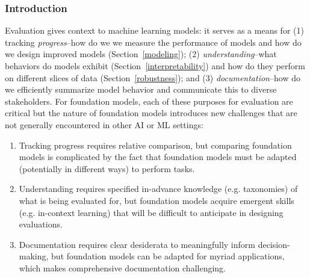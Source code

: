 \subsubsection{Introduction}
\label{sec:evaluation-introduction}
Evaluation gives context to machine learning models: it serves as a means for (1) tracking \textit{progress}--how do we we measure the performance of models and how do we design improved models (Section~\ref{modeling}); (2) \textit{understanding}--what behaviors do models exhibit (Section~\ref{interpretability}) and how do they perform on different slices of data (Section~\ref{robustness}); and (3) \textit{documentation}--how do we efficiently summarize model behavior and communicate this to diverse stakeholders. For foundation models, each of these purposes for evaluation are critical but the nature of foundation models introduces new challenges that are not generally encountered in other AI or ML settings:

\begin{enumerate}
    \item Tracking progress requires relative comparison, but comparing foundation models is complicated by the fact that foundation models must be adapted (potentially in different ways) to perform tasks.
    \item Understanding requires specified in-advance knowledge (e.g. taxonomies) of what is being evaluated for, but foundation models acquire emergent skills (e.g. in-context learning) that will be difficult to anticipate in designing evaluations.
    \item Documentation requires clear desiderata to meaningfully inform decision-making, but foundation models can be adapted for myriad applications, which makes comprehensive documentation challenging.
\end{enumerate}

